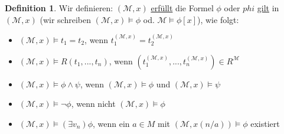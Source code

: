 \documentclass{article}
\theoremstyle{definition}
\newtheorem{dfn}{Definition}
\newcommand{\calM}{\mathcal{M}}
\begin{document}
    \begin{dfn}
        Wir definieren: $ (\calM, x) $ \underline{erfüllt} die Formel $ \phi $ oder $ phi $ \underline{gilt} in $ (\calM, x) $ (wir schreiben $ (\calM, x) \models \phi $ od. $ \calM \models \phi[x] $), wie folgt:
        \begin{itemize}
            \item $ (\calM, x) \models t_1 = t_2 $, wenn $ t^{(\calM, x)}_1 = t^{(\calM, x)}_2 $
            \item $ (\calM, x) \models R(t_1, ..., t_n) $, wenn $ (t_1^{(\calM, x)}, ..., t_n^{(\calM, x)}) \in R^\calM $
            \item $ (\calM, x) \models \phi \land \psi $, wenn $ (\calM, x) \models \phi $ und $ (\calM, x) \models \psi $
            \item $ (\calM, x) \models \neg \phi $, wenn nicht $ (\calM, x) \models \phi $
            \item $ (\calM, x) \models (\exists v_n) \phi $, wenn ein $ a \in M $ mit $ (\calM, x(n/a)) \models \phi $ existiert
        \end{itemize}
    \end{dfn}
\end{document}
